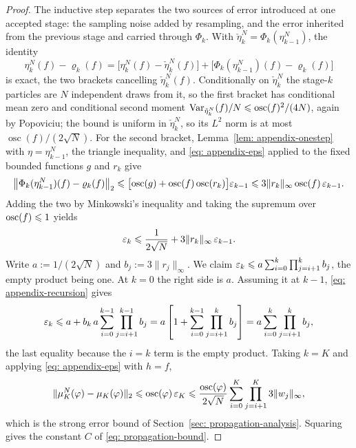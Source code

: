 \documentclass{article}
\begin{document}
\begin{proof}
The inductive step separates the two sources of error introduced at one accepted stage: the sampling noise added by resampling, and the error inherited from the previous stage and carried through $\Phi_k$. With $\check\eta_k^N=\Phi_k(\eta_{k-1}^N)$, the identity
\begin{equation*}
    \eta_k^N(f)-\varrho_k(f) = \bigl[\eta_k^N(f)-\check\eta_k^N(f)\bigr] + \bigl[\Phi_k(\eta_{k-1}^N)(f)-\varrho_k(f)\bigr]
\end{equation*}
is exact, the two brackets cancelling $\check\eta_k^N(f)$. Conditionally on $\check\eta_k^N$ the stage-$k$ particles are $N$ independent draws from it, so the first bracket has conditional mean zero and conditional second moment $\operatorname{Var}_{\check\eta_k^N}(f)/N\leqslant\operatorname{osc}(f)^2/(4N)$, again by Popoviciu; the bound is uniform in $\check\eta_k^N$, so its $L^2$ norm is at most $\operatorname{osc}(f)/(2\sqrt N)$. For the second bracket, Lemma~\ref{lem: appendix-onestep} with $\eta=\eta_{k-1}^N$, the triangle inequality, and \eqref{eq: appendix-eps} applied to the fixed bounded functions $g$ and $r_k$ give
\begin{equation*}
    \bigl\lVert\Phi_k(\eta_{k-1}^N)(f)-\varrho_k(f)\bigr\rVert_2
    \leqslant \bigl[\operatorname{osc}(g)+\operatorname{osc}(f)\operatorname{osc}(r_k)\bigr]\varepsilon_{k-1}
    \leqslant 3\lVert r_k\rVert_\infty\operatorname{osc}(f)\,\varepsilon_{k-1}.
\end{equation*}
Adding the two by Minkowski's inequality and taking the supremum over $\operatorname{osc}(f)\leqslant1$ yields
\begin{equation}
    \varepsilon_k \leqslant \frac{1}{2\sqrt N} + 3\lVert r_k\rVert_\infty\,\varepsilon_{k-1}.
    \label{eq: appendix-recursion}
\end{equation}
Write $a:=1/(2\sqrt N)$ and $b_j:=3\lVert r_j\rVert_\infty$. We claim $\varepsilon_k\leqslant a\sum_{i=0}^{k}\prod_{j=i+1}^{k}b_j$, the empty product being one. At $k=0$ the right side is $a$. Assuming it at $k-1$, \eqref{eq: appendix-recursion} gives
\begin{equation*}
    \varepsilon_k \leqslant a + b_k\,a\sum_{i=0}^{k-1}\prod_{j=i+1}^{k-1}b_j
    = a\left[1+\sum_{i=0}^{k-1}\prod_{j=i+1}^{k}b_j\right]
    = a\sum_{i=0}^{k}\prod_{j=i+1}^{k}b_j,
\end{equation*}
the last equality because the $i=k$ term is the empty product. Taking $k=K$ and applying \eqref{eq: appendix-eps} with $h=f$,
\begin{equation*}
    \lVert\mu_K^N(\varphi)-\mu_K(\varphi)\rVert_2 \leqslant \operatorname{osc}(\varphi)\,\varepsilon_K
    \leqslant \frac{\operatorname{osc}(\varphi)}{2\sqrt N}\sum_{i=0}^{K}\prod_{j=i+1}^{K}3\lVert w_j\rVert_\infty ,
\end{equation*}
which is the strong error bound of Section~\ref{sec: propagation-analysis}. Squaring gives the constant $C$ of \eqref{eq: propagation-bound}.
\end{proof}
\end{document}
